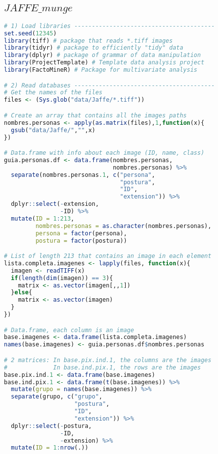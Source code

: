 \subsection{$JAFFE\_munge$}
\begin{lstlisting}[language=R, basicstyle=\small]
# 1) Load libraries ----------------------------------------
set.seed(12345)
library(tiff) # package that reads *.tiff images 
library(tidyr) # package to efficiently "tidy" data
library(dplyr) # package of grammar of data manipulation
library(ProjectTemplate) # Template data analysis project
library(FactoMineR) # Package for multivariate analysis

# 2) Read databases ----------------------------------------
# Get the names of the files
files <- (Sys.glob("data/Jaffe/*.tiff"))

# Create an array that contains all the images paths 
nombres.personas <- apply(as.matrix(files),1,function(x){
  gsub("data/Jaffe/","",x)  
})

# Data.frame with info about each image (ID, name, class)
guia.personas.df <- data.frame(nombres.personas,
                               nombres.personas) %>%
  separate(nombres.personas.1, c("persona", 
                                 "postura", 
                                 "ID", 
                                 "extension")) %>%
  dplyr::select(-extension,
                -ID) %>%
  mutate(ID = 1:213, 
         nombres.personas = as.character(nombres.personas),
         persona = factor(persona),
         postura = factor(postura))

# List of length 213 that contains an image in each element
lista.completa.imagenes <- lapply(files, function(x){  
  imagen <- readTIFF(x)
  if(length(dim(imagen)) == 3){
    matrix <- as.vector(imagen[,,1])
  }else{
    matrix <- as.vector(imagen)
  }
})

# Data.frame, each column is an image
base.imagenes <- data.frame(lista.completa.imagenes)
names(base.imagenes) <- guia.personas.df$nombres.personas

# 2 matrices: In base.pix.ind.1, the columns are the images
#             In base.ind.pix.1, the rows are the images            
base.pix.ind.1 <- data.frame(base.imagenes)
base.ind.pix.1 <- data.frame(t(base.imagenes)) %>% 
  mutate(grupo = names(base.imagenes)) %>% 
  separate(grupo, c("grupo", 
                    "postura", 
                    "ID", 
                    "extension")) %>% 
  dplyr::select(-postura, 
                -ID, 
                -extension) %>% 
  mutate(ID = 1:nrow(.))


\end{lstlisting}
